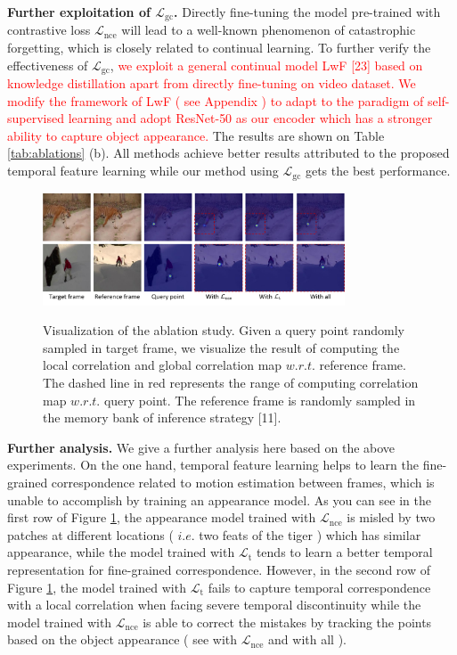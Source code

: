 \documentclass{article}
\begin{document}
\textbf{Further exploitation of $\mathcal{L}_{\mathrm{gc}}$.}  Directly fine-tuning the model pre-trained with contrastive loss $\mathcal{L}_{\mathrm{nce}}$ will lead to a well-known phenomenon of catastrophic forgetting, which is closely related to continual learning. To further verify the effectiveness of  $\mathcal{L}_{\mathrm{gc}}$,  \textcolor{red}{we exploit a general continual model LwF [23]  based on knowledge distillation apart from directly fine-tuning on video dataset. We modify the framework of LwF ( see Appendix ) to adapt to the paradigm of self-supervised learning and adopt ResNet-50 as our encoder which has a stronger ability to capture object appearance.} The results are shown on Table \ref{tab:ablations} (b). All methods achieve better results attributed to the proposed temporal feature learning while our method using $\mathcal{L}_{\mathrm{gc}}$ gets the best performance. 

\begin{figure}[!tb]
  \centering
  {\includegraphics[width=0.8\textwidth]{figure/abalations/ablataions.pdf}}
  \caption{\small Visualization of the ablation study. Given a query point randomly sampled in target frame, we visualize the result of computing the local correlation and global correlation map $w.r.t.$ reference frame. The dashed line in red represents the range of computing correlation map $w.r.t.$ query point. The reference frame is randomly sampled in the memory bank of inference strategy [11]. }
  \label{fig:ablations}
  \vspace{-7mm}
\end{figure}


\textbf{Further analysis.} 
We give a further analysis here based on the above experiments. On the one hand, temporal feature learning helps to learn the fine-grained correspondence related to motion estimation between frames, which is unable to accomplish by training an appearance model. As you can see in the first row of Figure \ref{fig:ablations}, the appearance model trained with $\mathcal{L}_{\mathrm{nce}}$ is misled by two patches at different locations ( $i.e.$ two feats of the tiger ) which has similar appearance, while the model trained with $\mathcal{L}_{\mathrm{t}}$ tends to learn a better temporal representation for fine-grained correspondence. However, in the second row of Figure \ref{fig:ablations}, the model trained with $\mathcal{L}_{\mathrm{t}}$ fails to capture temporal correspondence with a local correlation  when facing severe temporal discontinuity  while the model trained with $\mathcal{L}_{\mathrm{nce}}$ is able to correct the mistakes by tracking the points based on the object appearance ( see with $\mathcal{L}_{\mathrm{nce}}$ and with all ).
\end{document}
